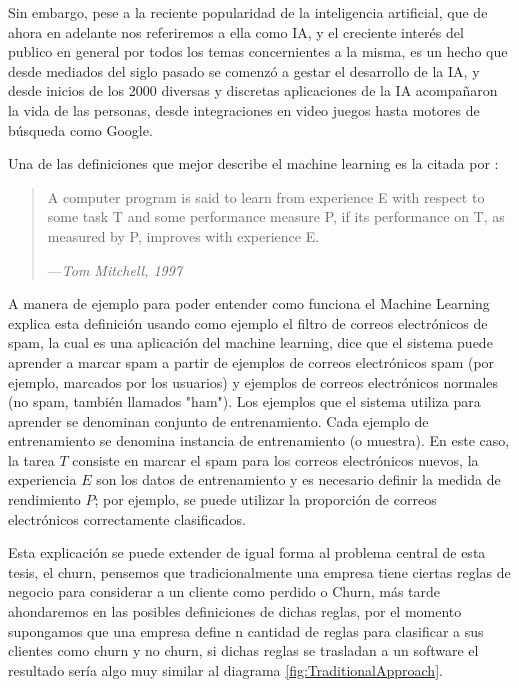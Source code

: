 Sin embargo, pese a la reciente popularidad de la inteligencia artificial, que de ahora en adelante nos referiremos a ella como IA, y el creciente interés del publico en general por todos los temas concernientes a la misma, es un hecho que desde mediados del siglo pasado se comenzó a gestar el desarrollo de la IA, y desde inicios de los 2000 diversas y discretas aplicaciones de la IA acompañaron la vida de las personas, desde integraciones en video juegos hasta motores de búsqueda como Google. 

Una de las definiciones que mejor describe el machine learning es la citada por \cite{Mitchell1997}:

\begin{quote}
	\small
	A computer program is said to learn from experience E with respect to some task T 
	and some performance measure P, if its performance on T, as measured by P, improves 
	with experience E.
	
	\begin{flushright}
		—\textit{Tom Mitchell, 1997}
	\end{flushright}
\end{quote}

A manera de ejemplo para poder entender como funciona el Machine Learning \cite[p. 4]{2017Géron} explica esta definición usando como ejemplo el filtro de correos electrónicos de spam, la cual es una aplicación del machine learning, dice que el sistema puede aprender a marcar spam a partir de ejemplos de correos electrónicos spam (por ejemplo, marcados por los usuarios) y ejemplos de correos electrónicos normales (no spam, también llamados "ham"). Los ejemplos que el sistema utiliza para aprender se denominan conjunto de entrenamiento. Cada ejemplo de entrenamiento se denomina instancia de entrenamiento (o muestra). En este caso, la tarea $T$ consiste en marcar el spam para los correos electrónicos nuevos, la experiencia $E$ son los datos de entrenamiento y es necesario definir la medida de rendimiento $P$; por ejemplo, se puede utilizar la proporción de correos electrónicos correctamente clasificados.

Esta explicación se puede extender de igual forma al problema central de esta tesis, el churn, pensemos que tradicionalmente una empresa tiene ciertas reglas de negocio para considerar a un cliente como perdido o Churn, más tarde ahondaremos en las posibles definiciones de dichas reglas, por el momento supongamos que una empresa define n cantidad de reglas para clasificar a sus clientes como churn y no churn, si dichas reglas se trasladan a un software el resultado sería algo muy similar al diagrama \ref{fig:TraditionalApproach}.

